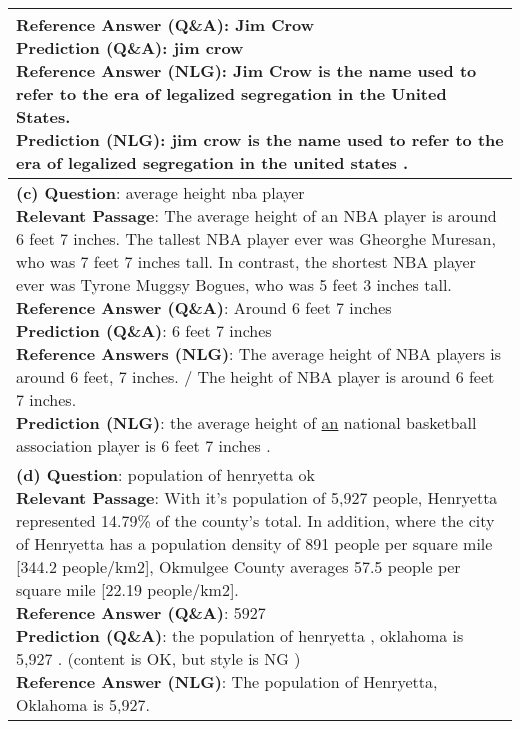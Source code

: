 \documentclass[11pt,a4paper]{article}
\newcommand{\cmark}{\ding{51}}
\newcommand{\xmark}{\ding{55}}
\theoremstyle{mydef}
\theoremstyle{myprob}
\begin{document}
\begin{table*}[h!]
{\begin{tabular}{p{50em}}
{\textbf{Reference Answer (Q\&A)}: Jim Crow \\
\textbf{Prediction (Q\&A)}: jim crow \cmark \\
\textbf{Reference Answer (NLG)}: Jim Crow is the name used to refer to the era of legalized segregation in the United States. \\
\textbf{Prediction (NLG)}: jim crow is the name used to refer to the era of legalized segregation in the united states . \cmark
}
\vspace{1pt}
\\ \hline
\vspace{0.5pt}
\pbox{50em}{
\textbf{(c) Question}: average height nba player\\
\textbf{Relevant Passage}: The average height of an NBA player is around 6 feet 7 inches. The tallest NBA player ever was Gheorghe Muresan, who was 7 feet 7 inches tall. In contrast, the shortest NBA player ever was Tyrone Muggsy Bogues, who was 5 feet 3 inches tall. \\
\textbf{Reference Answer (Q\&A)}: Around 6 feet 7 inches \\
\textbf{Prediction (Q\&A)}: 6 feet 7 inches	\cmark \\
\textbf{Reference Answers (NLG)}: The average height of NBA players is around 6 feet, 7 inches. / The height of NBA player is around 6 feet 7 inches.\\
\textbf{Prediction (NLG)}: the average height of \underline{an} national basketball association player is 6 feet 7 inches . \cmark
}
\vspace{1pt}
\\ \hline
\vspace{0.5pt}
\pbox{50em}{
\textbf{(d) Question}: population of henryetta ok\\
\textbf{Relevant Passage}: With it's population of 5,927 people, Henryetta represented 14.79\% of the county's total. In addition, where the city of Henryetta has a population density of 891 people per square mile [344.2 people/km2], Okmulgee County averages 57.5 people per square mile [22.19 people/km2].\\
\textbf{Reference Answer (Q\&A)}: 5927 \\
\textbf{Prediction (Q\&A)}: the population of henryetta , oklahoma is 5,927 .   \cmark \hspace{.5em} (content is OK, but style is NG \xmark)\\
\textbf{Reference Answer (NLG)}: The population of Henryetta, Oklahoma is 5,927. \\
}
\end{tabular}}
\end{table*}
\end{document}
